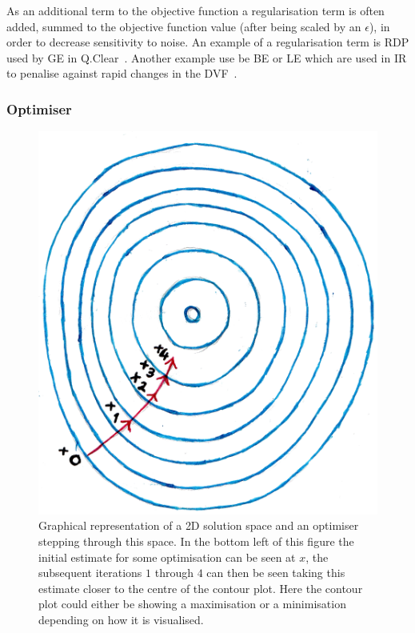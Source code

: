                 As an additional term to the objective function a regularisation term is often added, summed to the objective function value (after being scaled by an $\epsilon$), in order to decrease sensitivity to noise. An example of a regularisation term is \gls{RDP} used by \gls{GE} in Q.Clear~. Another example use be \gls{BE} or \gls{LE} which are used in \gls{IR} to penalise against rapid changes in the \gls{DVF}~.
                
            \subsubsection{Optimiser} \label{sec:optimiser}
                \begin{figure}
                    \centering
                        
                    \includegraphics[width=1.0\linewidth]{figures/background_optimisation.png}
                        
                    \captionsetup{singlelinecheck=false, justification=raggedright}
                    \caption{Graphical representation of a \gls{2D} solution space and an optimiser stepping through this space. In the bottom left of this figure the initial estimate for some optimisation can be seen at $x$, the subsequent iterations $1$ through $4$ can then be seen taking this estimate closer to the centre of the contour plot. Here the contour plot could either be showing a maximisation or a minimisation depending on how it is visualised.} \label{fig:optimiser_optimisation}
                \end{figure}
                
